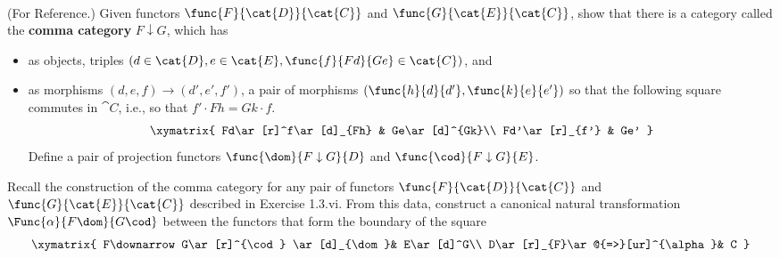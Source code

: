 \documentclass[main.tex]{subfiles}
\begin{document}
\paragraph{}
\begin{exercise}(For Reference.)
	Given functors $\func{F}{\cat{D}}{\cat{C}}$ and
	$\func{G}{\cat{E}}{\cat{C}}$, show that there is a category called the
	\textbf{comma category} $F\downarrow G$, which has\\
	\begin{itemize}
		\item as objects, triples $(d\in\cat{D}, e\in\cat{E},
			\func{f}{Fd}{Ge}\in\cat{C})$, and

		\item as morphisms $(d,e,f)\rightarrow(d',e',f')$, a pair of morphisms
			$(\func{h}{d}{d'},\func{k}{e}{e'})$ so that the following square
			commutes in $\cat{C}$, i.e., so that $f'\cdot Fh = Gk\cdot f$.
			\[\xymatrix{ Fd\ar[r]^f\ar[d]_{Fh} & Ge\ar[d]^{Gk}\\
					Fd'\ar[r]_{f'} & Ge' }\]
			Define a pair of projection functors $\func{\dom}{F\downarrow G}{D}$
			and $\func{\cod}{F\downarrow G}{E}$.
	\end{itemize}
\end{exercise}

\begin{exercise}
	Recall the construction of the comma category for any pair of functors
	$\func{F}{\cat{D}}{\cat{C}}$ and $\func{G}{\cat{E}}{\cat{C}}$ described in
	Exercise 1.3.vi. From this data, construct a canonical natural
	transformation $\Func{\alpha}{F\dom}{G\cod}$ between the functors that form
	the boundary of the square
	\[\xymatrix{
			F\downarrow G\ar[r]^{\cod} \ar[d]_{\dom}& E\ar[d]^G\\
			D\ar[r]_{F}\ar@{=>}[ur]^{\alpha}& C
		}\]
\end{exercise}
\end{document}
